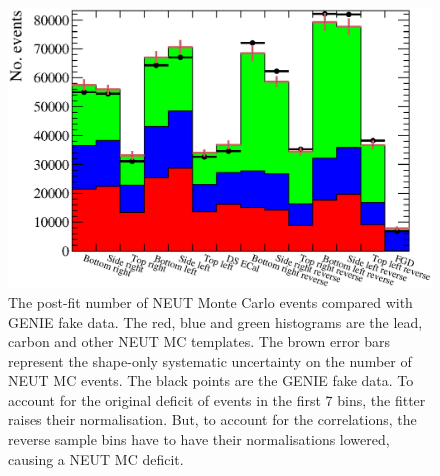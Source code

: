 \begin{figure}
  \centering
  \includegraphics[width=15cm]{images/measurement/validation/genie/MCTemplatesWithSystematics_GenieData_PostFit.eps}
  \caption{The post-fit number of NEUT Monte Carlo events compared with GENIE fake data.  The red, blue and green histograms are the lead, carbon and other NEUT MC templates.  The brown error bars represent the shape-only systematic uncertainty on the number of NEUT MC events.  The black points are the GENIE fake data.  To account for the original deficit of events in the first 7 bins, the fitter raises their normalisation.  But, to account for the correlations, the reverse sample bins have to have their normalisations lowered, causing a NEUT MC deficit.}
  \label{fig:MCTemplatesWithSystematicsGenieDataPostFit}
\end{figure}
\newline
\newline
